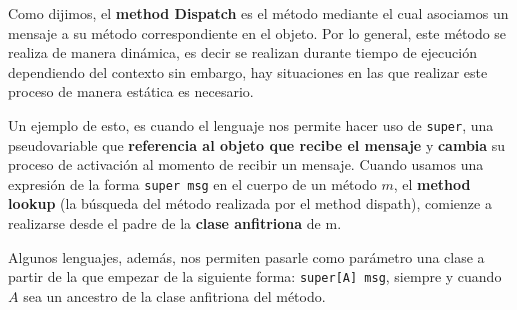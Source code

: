 Como dijimos, el \textbf{method Dispatch} es el método mediante el cual asociamos un mensaje a su método correspondiente en el objeto. Por lo general, este método se realiza de manera dinámica, es decir se realizan durante tiempo de ejecución dependiendo del contexto sin embargo, hay situaciones en las que realizar este proceso de manera estática es necesario. 

Un ejemplo de esto, es cuando el lenguaje nos permite hacer uso de \texttt{super}, una pseudovariable que \textbf{referencia al objeto que recibe el mensaje} y \textbf{cambia} su proceso de activación al momento de recibir un mensaje.
Cuando usamos una expresión de la forma \texttt{super msg} en el cuerpo de un método $m$, el \textbf{method lookup} (la búsqueda del método realizada por el method dispath), comienze a realizarse desde el padre de la \textbf{clase anfitriona} de m.

Algunos lenguajes, además, nos permiten pasarle como parámetro una clase a partir de la que empezar de la siguiente forma: \texttt{super[A] msg}, siempre y cuando $A$ sea un ancestro de la clase anfitriona del método.